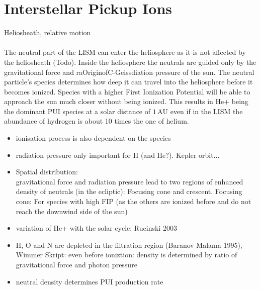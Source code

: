 \section{Interstellar Pickup Ions}
Heliosheath, relative motion \\ \\
The neutral part of the LISM can enter the heliosphere as it is not affected by the heliosheath (Todo). Inside the heliosphere the neutrals are guided only by the gravitational force and raOriginofC-Geissdiation pressure of the sun. The neutral particle's species determines how deep it can travel into the heliosphere before it becomes ionized. Species with a higher First Ionization Potential will be able to approach the sun much closer without being ionized. This results in He+ being the dominant PUI species at a solar distance of $1\,\mathrm{AU}$ even if in the LISM the abundance of hydrogen is about 10 times the one of helium.
\begin{itemize}
	\item ionisation process is also dependent on the species
	\item radiation pressure only important for H (and He?). Kepler orbit...
	\item Spatial distribution:\\
	gravitational force and radiation pressure lead to two regions of enhanced density of neutrals (in the ecliptic): Focusing cone and crescent.
	Focusing cone: For species with high FIP (as the others are ionized before and do not reach the downwind side of the sun)
	\item variation of He+ with the solar cycle: Rucinski 2003
	\item H, O and N are depleted in the filtration region (Baranov Malama 1995), Wimmer Skript: even before ioniztion: density is determined by ratio of gravitational force and photon pressure
	\item neutral density determines PUI production rate
\end{itemize}

